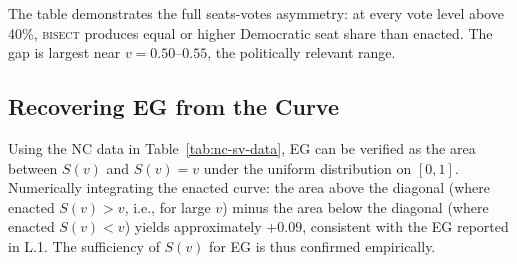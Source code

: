 The table demonstrates the full seats-votes asymmetry: at every vote level above
40\%, \textsc{bisect} produces equal or higher Democratic seat share than enacted.
The gap is largest near $v = 0.50$--$0.55$, the politically relevant range.

\subsection{Recovering EG from the Curve}

Using the NC data in Table~\ref{tab:nc-sv-data}, EG can be verified as the area
between $S(v)$ and $S(v)=v$ under the uniform distribution on $[0,1]$. Numerically
integrating the enacted curve: the area above the diagonal (where enacted $S(v) > v$,
i.e., for large $v$) minus the area below the diagonal (where enacted $S(v) < v$)
yields approximately $+0.09$, consistent with the EG reported in L.1. The sufficiency
of $S(v)$ for EG is thus confirmed empirically.
